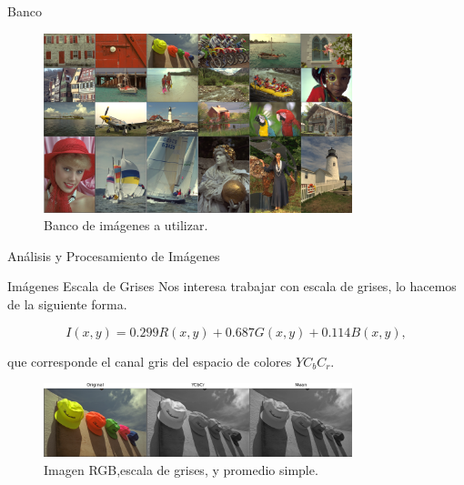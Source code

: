\documentclass{beamer}
\begin{document}
\begin{frame}{Banco}
    \begin{figure}[H]
        \centering
        \includegraphics[width=0.8\textwidth]{all_images_grid.png}
        \caption{Banco de im\'agenes a utilizar.}
    \end{figure}        
\end{frame}

\begin{frame}{Análisis y Procesamiento de Imágenes}
    \begin{block}{Im\'agenes Escala de Grises}
        Nos interesa trabajar con escala de grises, lo hacemos de la siguiente forma.

        \begin{equation}
            I(x, y)=0.299 R(x, y)+0.687 G(x, y)+0.114 B(x, y), 
            \label{eq:grayscale}
        \end{equation}

        que corresponde el canal gris del espacio de colores $YC_bC_r$.
    \end{block}
    \begin{figure}[H]
        \centering
        \includegraphics[width=0.8\textwidth]{img_ex_bw.png}
        \caption{Imagen RGB,escala de grises, y promedio simple.}
    \end{figure}
\end{frame}
\end{document}
